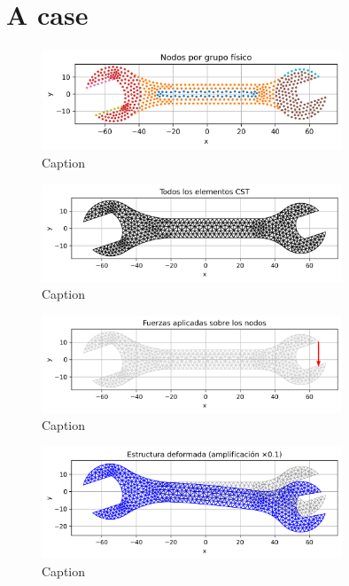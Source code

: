 \documentclass{article}  %
\begin{document}
\newpage

\section{A case}

\begin{figure}[H]
  \centering
  \includegraphics[width=0.8\textwidth]{GRAFICOS/Case a_nodes_por_grupo.png}
  \caption{Caption}
  \label{fig:wrench}
\end{figure}

\begin{figure}[H]
  \centering
  \includegraphics[width=0.8\textwidth]{GRAFICOS/Case a_elementos.png}
  \caption{Caption}
  \label{fig:deformed_shape}
\end{figure}

\begin{figure}[H]
  \centering
  \includegraphics[width=0.8\textwidth]{GRAFICOS/Case a_fuerzas.png}
  \caption{Caption}
  \label{fig:strain}
\end{figure}

\begin{figure}[H]
  \centering
  \includegraphics[width=0.8\textwidth]{GRAFICOS/Case a_deformada.png}
  \caption{Caption}
  \label{fig:stress}
\end{figure}
\end{document}
